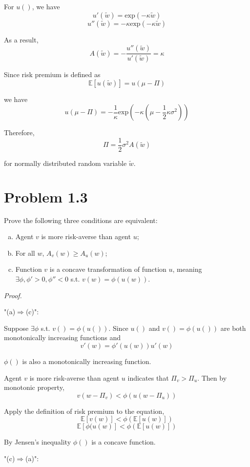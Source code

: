 \documentclass[a4paper]{article}
\begin{document}
For $u()$, we have
\[u'(\tilde{w})=\text{exp}(-\kappa \tilde{w})\]
\[u''(\tilde{w})=-\kappa\text{exp}(-\kappa \tilde{w})\]

As a result,
\[A(\tilde{w})=-\frac{u''(\tilde{w})}{u'(\tilde{w})}=\kappa\]

Since risk premium is defined as
\[\mathbb{E}[u(\tilde{w})]=u(\mu-\Pi)\]

we have
\[u(\mu-\Pi)=-\frac{1}{\kappa}\text{exp}(-\kappa(\mu-\frac{1}{2}\kappa\sigma^2))\]

Therefore,
\[\Pi=\frac{1}{2}\sigma^2 A(\tilde{w})\]

for normally distributed random variable $\tilde{w}$.

\section{Problem 1.3}

Prove the following three conditions are equivalent:
\begin{enumerate}[(a)]
\item Agent $v$ is more risk-averse than agent $u$;
\item For all $w$, $A_v(w) \geq A_u(w)$;
\item Function $v$ is a concave transformation of function $u$, meaning $\exists\phi, \phi'>0, \phi''<0$ s.t. $v(w)=\phi(u(w))$.
\end{enumerate}

\textit{Proof.}\newline

"(a)$\Rightarrow$(c)":\newline

Suppose $\exists\phi$ s.t. $v()=\phi(u())$. Since $u()$ and $v()=\phi(u())$ are both monotonically increasing functions and
\[v'(w)=\phi'(u(w))u'(w)\]

$\phi()$ is also a monotonically increasing function.\newline

Agent $v$ is more risk-averse than agent $u$ indicates that $\Pi_v>\Pi_u$. Then by monotonic property, 
\[v(w-\Pi_v)<\phi(u(w-\Pi_u))\]

Apply the definition of risk premium to the equation,
\[\mathbb{E}[v(w)]<\phi(\mathbb{E}[u(w)])\]
\[\mathbb{E}[\phi(u(w)]<\phi(\mathbb{E}[u(w)])\]

By Jensen's inequality $\phi()$ is a concave function.\newline

"(c)$\Rightarrow$(a)":\newline
\end{document}
